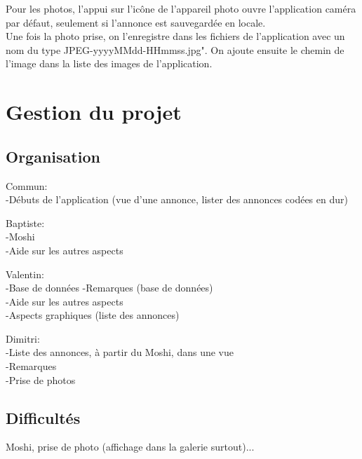 \documentclass[a4paper,12pt]{article} %
\begin{document}
Pour les photos, l'appui sur l'icône de l'appareil photo ouvre l'application caméra par défaut, seulement si l'annonce est sauvegardée en locale.\\
Une fois la photo prise, on l'enregistre dans les fichiers de l'application avec un nom du type JPEG-yyyyMMdd-HHmmss.jpg". On ajoute ensuite le chemin de l'image dans la liste des images de l'application.

\section{Gestion du projet}

\subsection{Organisation}
Commun:\\
-Débuts de l'application (vue d'une annonce, lister des annonces codées en dur)
\vspace{0.5cm}

Baptiste:\\
-Moshi\\
-Aide sur les autres aspects
\vspace{0.5cm}

Valentin:\\
-Base de données
-Remarques (base de données)\\
-Aide sur les autres aspects\\
-Aspects graphiques (liste des annonces)
\vspace{0.5cm}

Dimitri:\\
-Liste des annonces, à partir du Moshi, dans une vue\\
-Remarques\\
-Prise de photos

\subsection{Difficultés}
Moshi, prise de photo (affichage dans la galerie surtout)...
\end{document}
